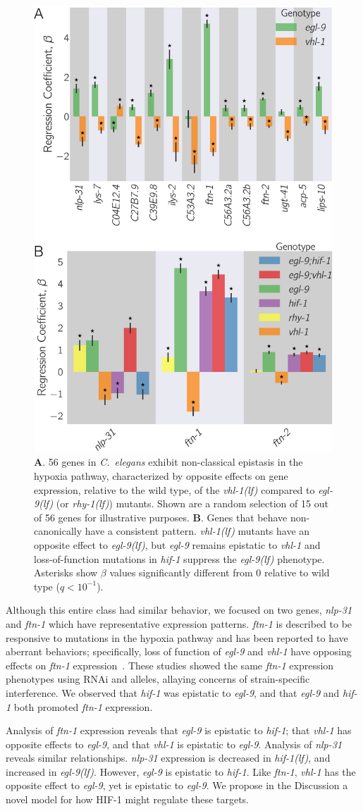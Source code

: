 \documentclass[9pt,twocolumn,twoside]{pnas-new}
\newcommand{\qval}[1]{$q<10^{-#1}$}
\newcommand{\cel}{\emph{C.~elegans}}
\newcommand{\gene}[1]{\mbox{\emph{#1}}}
\newcommand{\nlp}{\gene{nlp-31}}
\newcommand{\ftna}{\gene{ftn-1}}
\newcommand{\egl}{\gene{egl-9(lf)}}
\newcommand{\rhy}{\gene{rhy-1(lf)}}
\newcommand{\vhl}{\gene{vhl-1(lf)}}
\newcommand{\hif}{\gene{hif-1(lf)}}
\newcommand{\hifp}{HIF-1}
\newcommand{\hifohtargets}{56}
\begin{document}
\begin{figure}[tbhp]
  \centering
  \includegraphics[width=.4\textwidth]{../figs/hif1oh_epistasis.pdf}
  \caption{
    \textbf{A}. \hifohtargets{} genes in \cel{} exhibit non-classical epistasis
    in the hypoxia pathway, characterized by opposite effects on gene expression,
    relative to the wild type, of the \vhl{} compared to \egl{} (or \rhy{})
    mutants. Shown are a random selection of 15 out of \hifohtargets{} genes for
    illustrative purposes. \textbf{B}. Genes that behave non-canonically  have a
    consistent pattern. \vhl{} mutants have an opposite effect to \egl{}, but
    \gene{egl-9} remains epistatic to \gene{vhl-1} and loss-of-function
    mutations in \gene{hif-1} suppress the \egl{} phenotype. Asterisks show
    $\beta$ values significantly different from 0 relative to wild type
    (\qval{1}).
  }
\label{fig:hif1oh}
\end{figure}

Although this entire class had similar behavior, we focused on
two genes, \nlp{} and \ftna{} which have representative expression patterns.
\ftna{} is described to be responsive to mutations in the hypoxia
pathway and has been reported to have aberrant behaviors; specifically, loss of
function of \gene{egl-9} and \gene{vhl-1} have opposing effects on \ftna{}
expression~\cite{Ackerman2012,Romney2011}. These studies showed the same
\ftna{} expression phenotypes using RNAi and alleles,
allaying concerns of strain-specific interference. We observed that \gene{hif-1}
was epistatic to \gene{egl-9}, and that \gene{egl-9} and \gene{hif-1} both
promoted \ftna{} expression.

Analysis of \ftna{} expression reveals that \gene{egl-9} is epistatic to
\gene{hif-1}; that \gene{vhl-1} has opposite effects to \gene{egl-9}, and that
\gene{vhl-1} is epistatic to \gene{egl-9}. Analysis of \nlp{} reveals similar
relationships. \nlp{} expression is decreased in \hif{}, and increased in
\egl{}. However, \gene{egl-9} is epistatic to \gene{hif-1}. Like \ftna{},
\gene{vhl-1} has the opposite effect to \gene{egl-9}, yet is epistatic to
\gene{egl-9}. We propose in the Discussion a novel model for how \hifp{} might
regulate these targets.
\end{document}
